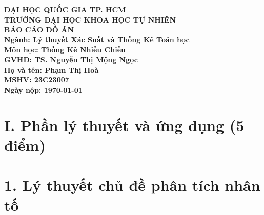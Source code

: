 \documentclass{article}
\begin{document}
\begin{titlepage}
    \begin{mdframed}
        \centering
        \vspace*{1cm}
        
        {\Large \textbf{ĐẠI HỌC QUỐC GIA TP. HCM}}\\[0.5cm]
        {\Large \textbf{TRƯỜNG ĐẠI HỌC KHOA HỌC TỰ NHIÊN}}\\[2cm]
        
        {\Huge \textbf{BÁO CÁO ĐỒ ÁN}}\\[2cm]
        
        {\large \textbf{Ngành: Lý thuyết Xác Suất và Thống Kê Toán học}}\\
        {\large \textbf{Môn học: Thống Kê Nhiều Chiều}}\\
        {\large \textbf{GVHD: TS. Nguyễn Thị Mộng Ngọc}}\\[1.5cm]
        
        {\large \textbf{Họ và tên: Phạm Thị Hoà}}\\
        {\large \textbf{MSHV: 23C23007}}\\[3cm]
    
        {\Large \textbf{Ngày nộp: \today}}
    \end{mdframed}
\end{titlepage}

%
%
%
%
%
%


\section*{I. Phần lý thuyết và ứng dụng (5 điểm)}
\vspace{0cm}

\section* {1. Lý thuyết chủ đề phân tích nhân tố}
\vspace{0cm}
\end{document}
